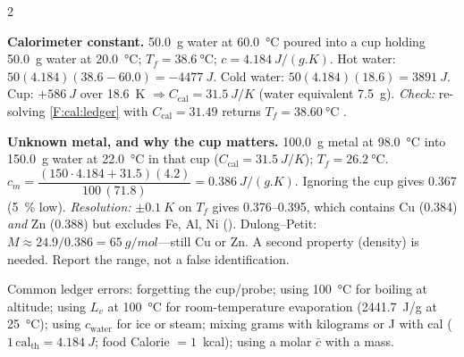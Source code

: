 \begin{multicols}{2}
\begin{demobox}\textbf{Calorimeter constant.} \SI{50.0}{g} water at \SI{60.0}{\celsius} poured into a cup holding \SI{50.0}{g} water at \SI{20.0}{\celsius}; $T_f=\SI{38.6}{\celsius}$; $c=\SI{4.184}{J/(g.K)}$.
Hot water: $50(4.184)(38.6-60.0)=\SI{-4477}{J}$. Cold water: $50(4.184)(18.6)=\SI{+3891}{J}$. Cup: $+\SI{586}{J}$ over \SI{18.6}{K} $\Rightarrow C_{\text{cal}}=\SI{31.5}{J/K}$ (water equivalent \SI{7.5}{g}).
\emph{Check:} re-solving \eqref{F:cal:ledger} with $C_{\text{cal}}=31.49$ returns $T_f=\SI{38.60}{\celsius}$ \checkmark.\end{demobox}

\begin{demobox}\textbf{Unknown metal, and why the cup matters.} \SI{100.0}{g} metal at \SI{98.0}{\celsius} into \SI{150.0}{g} water at \SI{22.0}{\celsius} in that cup ($C_{\text{cal}}=\SI{31.5}{J/K}$); $T_f=\SI{26.2}{\celsius}$.
$c_m=\dfrac{(150\cdot4.184+31.5)(4.2)}{100\,(71.8)}=\SI{0.386}{J/(g.K)}$. Ignoring the cup gives 0.367 (\SI{5}{\percent} low).
\emph{Resolution:} $\pm\SI{0.1}{K}$ on $T_f$ gives 0.376--0.395, which contains Cu (0.384) \emph{and} Zn (0.388) but excludes Fe, Al, Ni (). Dulong--Petit: $M\approx24.9/0.386=\SI{65}{g/mol}$---still Cu or Zn. A second property (density) is needed. Report the range, not a false identification.\end{demobox}

\begin{trapbox}Common ledger errors: forgetting the cup/probe; using \SI{100}{\celsius} for boiling at altitude; using $L_v$ at \SI{100}{\celsius} for room-temperature evaporation (\SI{2441.7}{J/g} at \SI{25}{\celsius}); using $c_{\text{water}}$ for ice or steam; mixing grams with kilograms or J with cal ($1\,\mathrm{cal_{th}}=\SI{4.184}{J}$; food Calorie $=1$~kcal); using a molar $\bar c$ with a mass.\end{trapbox}
\end{multicols}
